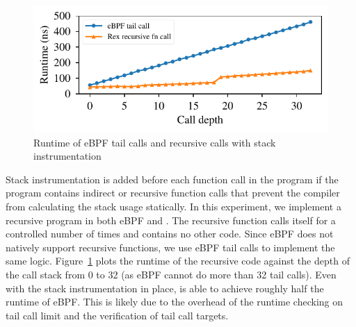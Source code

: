 \begin{figure}[t]
    \includegraphics[width=1.0\linewidth]{figs/recursive.pdf}
    \centering
    \vspace{-25pt}
    \caption{Runtime of eBPF tail calls and \projname{} recursive calls with
    stack instrumentation}
    \label{fig:eval-recursion}
    \vspace{-10pt}
\end{figure}
Stack instrumentation is added before each
    function call in the \projname{} program if the program contains indirect
    or recursive function calls that prevent the compiler from calculating the
    stack usage statically.
In this experiment, we implement a recursive program in both
    eBPF and \projname{}.
The recursive function calls itself for a controlled number of times and contains
    no other code.
Since eBPF does not natively support recursive functions, we use eBPF tail
    calls to implement the same logic.
Figure~\ref{fig:eval-recursion} plots the runtime of the recursive code against
    the depth of the call stack from 0 to 32 (as eBPF cannot do more than 32
    tail calls).
Even with the stack instrumentation in place, \projname{} is able to
    achieve roughly half the runtime of eBPF.
This is likely due to the overhead of the runtime checking on tail
    call limit and the verification of tail call targets.

